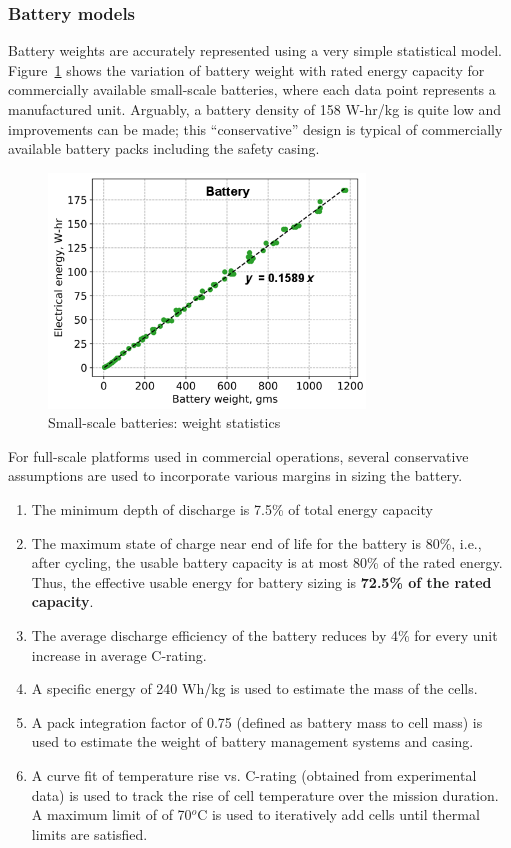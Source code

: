 \subsubsection{Battery models}
Battery weights are accurately represented using a very simple statistical model. Figure~\ref{fig:smallbattery} shows the variation of battery weight with rated energy capacity for commercially available small-scale batteries, where each data point represents a manufactured unit. Arguably, a battery density of 158 W-hr/kg is quite low and improvements can be made;  this ``conservative'' design is typical of commercially available battery packs including the safety casing. 

\begin{figure}
\begin{center}
\includegraphics[width=0.75\textwidth]{images/battery.png}
\vspace{-0.1cm}
\caption{Small-scale batteries: weight statistics}
\label{fig:smallbattery}
\end{center}
\end{figure}

For full-scale platforms used in commercial operations, several conservative assumptions are used to incorporate various margins in sizing the battery. 
\begin{enumerate}
\item The minimum depth of discharge is 7.5\% of total energy capacity
\item The maximum state of charge near end of life for the battery is 80\%, i.e., after cycling, the usable battery capacity is at most 80\% of the rated energy. Thus, the effective usable energy for battery sizing is \textbf{72.5\% of the rated capacity}. 
\item The average discharge efficiency of the battery reduces by 4\% for every unit increase in average C-rating. 
\item A specific energy of 240 Wh/kg is used to estimate the mass of the cells.
\item A pack integration factor of 0.75 (defined as battery mass to cell mass) is used to estimate the weight of battery management systems and casing.
\item A curve fit of temperature rise vs. C-rating (obtained from experimental data) is used to track the rise of cell temperature over the mission duration. A maximum  limit of of 70$^o$C is used to iteratively add cells until thermal limits are satisfied.
\end{enumerate}

